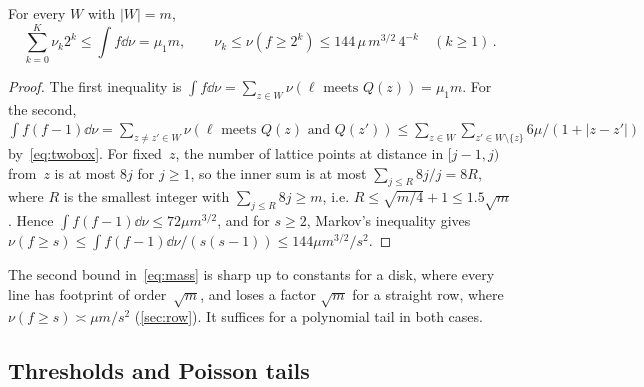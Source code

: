 \documentclass[11pt,letterpaper]{article}
\begin{document}
\begin{lemma}
\label{lem:mass}
For every $W$ with $\lvert W\rvert=m$,
\begin{equation}
\label{eq:mass}
  \sum_{k=0}^K\nu_k2^k\le\int f\dd\nu=\mu_1m,\qquad
  \nu_k\le\nu(f\ge2^k)\le144\,\mu\,m^{3/2}\,4^{-k}\quad(k\ge1)\,.
\end{equation}
\end{lemma}

\begin{proof}
The first inequality is $\int f\dd\nu=\sum_{z\in W}\nu(\ell\text{ meets }Q(z))=\mu_1m$. For the second, $\int f(f-1)\dd\nu=\sum_{z\neq z'\in W}\nu(\ell\text{ meets }Q(z)\text{ and }Q(z'))\le\sum_{z\in W}\sum_{z'\in W\setminus\{z\}}6\mu/(1+\lvert z-z'\rvert)$ by~\eqref{eq:twobox}. For fixed~$z$, the number of lattice points at distance in $[j-1,j)$ from~$z$ is at most $8j$ for $j\ge1$, so the inner sum is at most $\sum_{j\le R}8j/j=8R$, where $R$ is the smallest integer with $\sum_{j\le R}8j\ge m$, i.e. $R\le\sqrt{m/4}+1\le1.5\sqrt m$. Hence $\int f(f-1)\dd\nu\le72\mu m^{3/2}$, and for $s\ge2$, Markov's inequality gives $\nu(f\ge s)\le\int f(f-1)\dd\nu/(s(s-1))\le144\mu m^{3/2}/s^2$.
\end{proof}

The second bound in~\eqref{eq:mass} is sharp up to constants for a disk, where every line has footprint of order~$\sqrt m$, and loses a factor $\sqrt m$ for a straight row, where $\nu(f\ge s)\asymp\mu m/s^2$ (\cref{sec:row}). It suffices for a polynomial tail in both cases.

\subsection{Thresholds and Poisson tails}
\end{document}
